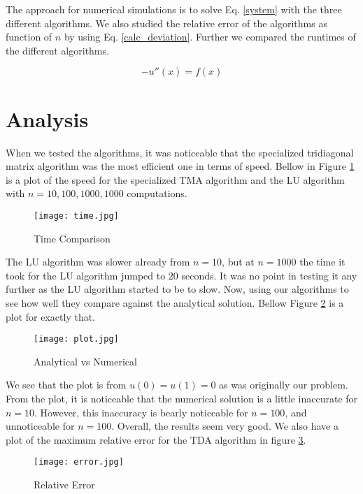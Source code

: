 \documentclass{article}
\begin{document}
The approach for numerical simulations is to solve Eq. \eqref{system} with the three different algorithms. We also studied the relative error of the algorithms as function of $n$ by using Eq. \eqref{calc_deviation}. Further we compared the runtimes of the different algorithms.

$$-u''(x) = f(x)$$

\section{Analysis}
When we tested the algorithms, it was noticeable that the specialized tridiagonal matrix algorithm was the most efficient one in terms of speed. Bellow in Figure \ref{fig:time} is a plot of the speed for the specialized TMA algorithm and the LU algorithm with $n=10,100,1000,1000$ computations.
\begin{figure}[h!]
\centering
 \texttt{[image: time.jpg]}
\caption{Time Comparison}
\label{fig:time}
\end{figure}

The LU algorithm was slower already from $n=10$, but at $n=1000$ the time it took for the LU algorithm jumped to 20 seconds. It was no point in testing it any further as the LU algorithm started to be to slow. 
\newline\newline
Now, using our algorithms to see how well they compare against the analytical solution. Bellow Figure \ref{fig:plot} is a plot for exactly that. 

\begin{figure}[h!]
\centering
\texttt{[image: plot.jpg]}
\caption{Analytical vs Numerical}
\label{fig:plot}
\end{figure}

We see that the plot is from $u(0)=u(1)=0$ as was originally our problem. From the plot, it is noticeable that the numerical solution is a little inaccurate for $n=10$. However, this inaccuracy is bearly noticeable for $n=100$, and unnoticeable for $n=100$. Overall, the results seem very good.
\newline\newline
We also have a plot of the maximum relative error for the TDA algorithm in figure \ref{fig:error}. 
\begin{figure}[h!]
\centering
\texttt{[image: error.jpg]}
\caption{Relative Error}
\label{fig:error}
\end{figure}
\end{document}
